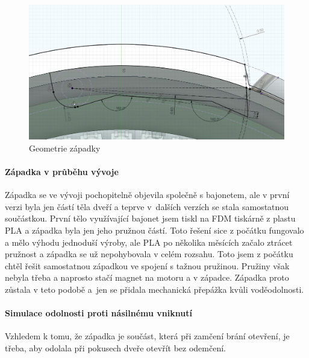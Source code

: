 \begin{figure}[htbp]
    \centering
    \includegraphics[width=\textwidth]{kapitoly/obrazky/E4/zapadka/uhel_cela.png}
    \caption{Geometrie západky}
    \label{fig:E4-uhel_cela_zapadky}
\end{figure}

\newpage
\paragraph{Západka v průběhu vývoje}

Západka se ve vývoji pochopitelně objevila společně s bajonetem, ale v první verzi byla jen částí těla dveří a teprve v~dalších verzích se stala
samostatnou součástkou. První tělo využívající bajonet jsem tiskl na FDM tiskárně z plastu PLA a západka byla jen jeho pružnou částí. Toto řešení sice 
z počátku fungovalo a mělo výhodu jednoduší výroby, ale PLA po několika měsících začalo ztrácet pružnost a západka se už nepohybovala v celém rozsahu.
Toto jsem z počátku chtěl řešit samostatnou západkou ve spojení s tažnou pružinou. Pružiny však nebyla třeba a naprosto stačí magnet na motoru a v západce.
Západka proto zůstala v teto podobě a~jen se přidala mechanická přepážka kvůli voděodolnosti. 

\paragraph{Simulace odolnosti proti násilnému vniknutí}
Vzhledem k tomu, že západka je součást, která při zamčení brání otevření, je třeba, aby odolala při pokusech dveře otevřít bez odemčení.

